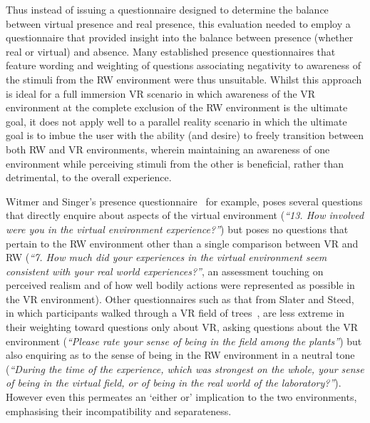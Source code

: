 Thus instead of issuing a questionnaire designed to determine the balance between virtual presence and real presence, this evaluation needed to employ a questionnaire that provided insight into the balance between presence (whether real or virtual) and absence. Many established presence questionnaires that feature wording and weighting of questions associating negativity to awareness of the stimuli from the RW environment were thus unsuitable. Whilst this approach is ideal for a full immersion VR scenario in which awareness of the VR environment at the complete exclusion of the RW environment is the ultimate goal, it does not apply well to a parallel reality scenario in which the ultimate goal is to imbue the user with the ability (and desire) to freely transition between both RW and VR environments, wherein maintaining an awareness of one environment while perceiving stimuli from the other is beneficial, rather than detrimental, to the overall experience.

Witmer and Singer's presence questionnaire~\cite{Witmer1998} for example, poses several questions that directly enquire about aspects of the virtual environment (\textit{``13. How involved were you in the virtual environment experience?''}) but poses no questions that pertain to the RW environment other than a single comparison between VR and RW (\textit{``7. How much did your experiences in the virtual environment seem consistent with your real world experiences?''}, an assessment touching on perceived realism and of how well bodily actions were represented as possible in the VR environment). Other questionnaires such as that from Slater and Steed, in which participants walked through a VR field of trees~\cite{Slater1998}, are less extreme in their weighting toward questions only about VR, asking questions about the VR environment (\textit{``Please rate your sense of being in the field among the plants''}) but also enquiring as to the sense of being in the RW environment in a neutral tone (\textit{``During the time of the experience, which was strongest on the whole, your sense of being in the virtual field, or of being in the real world of the laboratory?''}). However even this permeates an `either or' implication to the two environments, emphasising their incompatibility and separateness.


